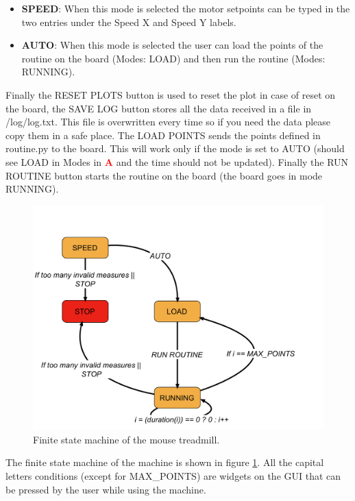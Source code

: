 \documentclass[12pt,a4paper]{article}
\begin{document}
\begin{itemize}
\begin{itemize}
		\item \textbf{SPEED}: When this mode is selected the motor setpoints can be typed in the two entries under the Speed X and Speed Y labels.
		\item \textbf{AUTO}: When this mode is selected the user can load the points of the routine on the board (Modes: LOAD) and then run the routine (Modes: RUNNING).
	\end{itemize} 
	Finally the RESET PLOTS button is used to reset the plot in case of reset on the board, the SAVE LOG button stores all the data received in a file in /log/log.txt. This file is overwritten every time so if you need the data please copy them in a safe place. The LOAD POINTS sends the points defined in routine.py to the board. This will work only if the mode is set to AUTO (should see LOAD in Modes in  \textcolor{red}{\textbf{A}} and the time should not be updated). Finally the RUN ROUTINE button starts the routine on the board (the board goes in mode RUNNING).	
\end{itemize}  
\begin{figure}[H]
	\centering
	\includegraphics[width=0.7\linewidth]{fig/FSM.pdf}
	\caption{Finite state machine of the mouse treadmill.}\label{fig:FSM}
\end{figure}
The finite state machine of the machine is shown in figure \ref{fig:FSM}. All the capital letters conditions (except for MAX\_POINTS) are widgets on the GUI that can be pressed by the user while using the machine.
\end{document}
